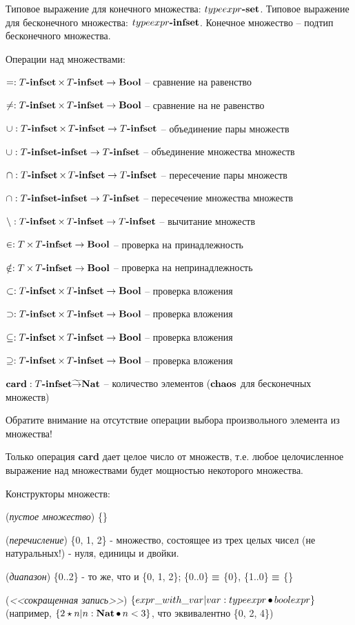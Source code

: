 \documentclass[14pt, twoside]{extreport}
\begin{document}
Типовое выражение для конечного множества: $typeexpr\textbf{-set}$. Типовое выражение для бесконечного множества: $typeexpr\textbf{-infset}$. Конечное множество -- подтип бесконечного множества.

Операции над множествами:
\begin{list}{}{}
\item $= : T\textbf{-infset} \mathop{\times} T\textbf{-infset} \rightarrow \textbf{Bool}$ -- сравнение на равенство
\item $\neq : T\textbf{-infset} \mathop{\times} T\textbf{-infset} \rightarrow \textbf{Bool}$ -- сравнение на не равенство
\item $\mathop{\cup}: T\textbf{-infset} \mathop{\times} T\textbf{-infset} \rightarrow T\textbf{-infset}$ -- объединение пары множеств
\item $\mathop{\cup}: T\textbf{-infset}\textbf{-infset} \rightarrow T\textbf{-infset}$ -- объединение множества множеств
\item $\mathop{\cap}: T\textbf{-infset} \mathop{\times} T\textbf{-infset} \rightarrow T\textbf{-infset}$ -- пересечение пары множеств
\item $\mathop{\cap}: T\textbf{-infset}\textbf{-infset} \rightarrow T\textbf{-infset}$ -- пересечение множества множеств
\item $\mathop{\setminus}: T\textbf{-infset} \mathop{\times} T\textbf{-infset} \rightarrow T\textbf{-infset}$ -- вычитание множеств
\item $\in: T \mathop{\times} T\textbf{-infset} \rightarrow \textbf{Bool}$ -- проверка на принадлежность
\item $\notin: T \mathop{\times} T\textbf{-infset} \rightarrow \textbf{Bool}$ -- проверка на непринадлежность
\item $\subset: T\textbf{-infset} \mathop{\times} T\textbf{-infset} \rightarrow \textbf{Bool}$ -- проверка вложения
\item $\supset: T\textbf{-infset} \mathop{\times} T\textbf{-infset} \rightarrow \textbf{Bool}$ -- проверка вложения
\item $\subseteq: T\textbf{-infset} \mathop{\times} T\textbf{-infset} \rightarrow \textbf{Bool}$ -- проверка вложения
\item $\supseteq: T\textbf{-infset} \mathop{\times} T\textbf{-infset} \rightarrow \textbf{Bool}$ -- проверка вложения
\item $\mathop{\textbf{card}}: T\textbf{-infset} \widetilde{\rightarrow} \textbf{Nat}$ -- количество элементов
($\textbf{chaos}$ для бесконечных множеств)
\end{list}

Обратите внимание на отсутствие операции выбора произвольного элемента из множества!

Только операция \textbf{card} дает целое число от множеств, т.е. любое целочисленное выражение над множествами будет мощностью некоторого множества.

Конструкторы множеств:
\begin{list}{}{}
\item (\emph{пустое множество}) \{\}
\item (\emph{перечисление}) \{0, 1, 2\} - множество, состоящее из трех целых чисел (не
натуральных!) - нуля, единицы и двойки.
\item (\emph{диапазон}) \{0..2\} -  то же, что и \{0, 1, 2\};
\{0..0\} $\mathop{\equiv}$ \{0\}, \{1..0\} $\mathop{\equiv}$ \{\}
\item (\emph{<<сокращенная запись>>}) $\{ expr\_with\_var | var : typeexpr
\mathop{\bullet} boolexpr\}$ (например, $\{2 \star n | n : \textbf{Nat} \mathop{\bullet} n < 3
\}$, что эквивалентно \{0, 2, 4\})
\end{list}
\end{document}
